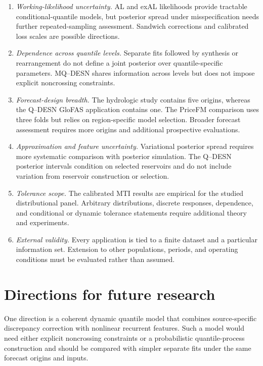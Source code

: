 \begin{enumerate}[label=(\arabic*)]
\item \textit{Working-likelihood uncertainty.} AL and exAL likelihoods provide
tractable conditional-quantile models, but posterior spread under
misspecification needs further repeated-sampling assessment. Sandwich
corrections and calibrated loss scales are possible directions.

\item \textit{Dependence across quantile levels.} Separate fits followed by
synthesis or rearrangement do not define a joint posterior over
quantile-specific parameters. MQ--DESN shares information across levels but
does not impose explicit noncrossing constraints.

\item \textit{Forecast-design breadth.} The hydrologic study contains five
origins, whereas the Q--DESN GloFAS application contains one. The PriceFM
comparison uses three folds but relies on region-specific model selection.
Broader forecast assessment requires more origins and additional prospective
evaluations.

\item \textit{Approximation and feature uncertainty.} Variational posterior
spread requires more systematic comparison with posterior simulation. The
Q--DESN posterior intervals condition on selected reservoirs and do not include
variation from reservoir construction or selection.

\item \textit{Tolerance scope.} The calibrated MTI results are empirical for
the studied distributional panel. Arbitrary distributions, discrete responses,
dependence, and conditional or dynamic tolerance statements require additional
theory and experiments.

\item \textit{External validity.} Every application is tied to a finite dataset
and a particular information set. Extension to other populations, periods, and
operating conditions must be evaluated rather than assumed.
\end{enumerate}

\section{Directions for future research}
\label{sec:synthesis-future}

One direction is a coherent dynamic quantile model that combines
source-specific discrepancy correction with nonlinear recurrent features. Such
a model would need either explicit noncrossing constraints or a probabilistic
quantile-process construction and should be compared with simpler separate
fits under the same forecast origins and inputs.


